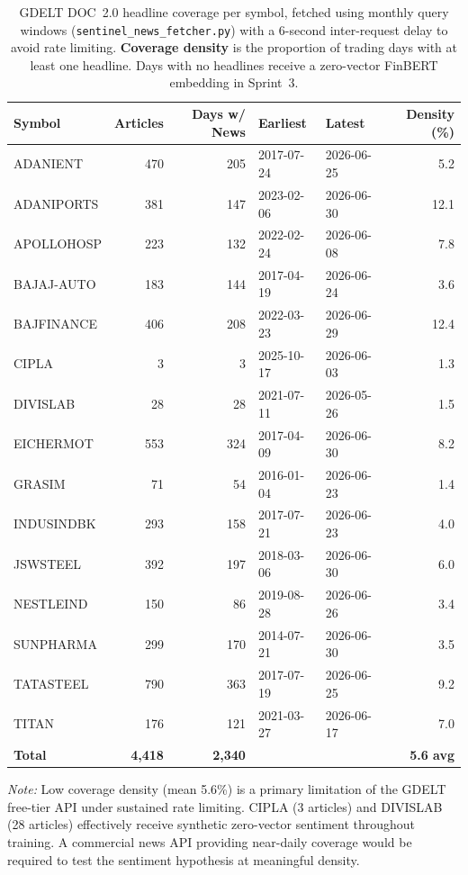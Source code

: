\begin{table}[htbp]
\centering
\caption{%
  GDELT DOC~2.0 headline coverage per symbol, fetched using monthly
  query windows (\texttt{sentinel\_news\_fetcher.py}) with a 6-second
  inter-request delay to avoid rate limiting.
  \textbf{Coverage density} is the proportion of trading days with
  at least one headline. Days with no headlines receive a zero-vector
  FinBERT embedding in Sprint~3.
}
\label{tab:news_coverage}
\setlength{\tabcolsep}{6pt}
\begin{tabular}{l r r l l r}
\toprule
\textbf{Symbol} &
  \textbf{Articles} &
  \textbf{Days w/ News} &
  \textbf{Earliest} &
  \textbf{Latest} &
  \textbf{Density (\%)} \\
\midrule
ADANIENT   & 470 & 205 & 2017-07-24 & 2026-06-25 & 5.2 \\
ADANIPORTS & 381 & 147 & 2023-02-06 & 2026-06-30 & 12.1 \\
APOLLOHOSP & 223 & 132 & 2022-02-24 & 2026-06-08 & 7.8 \\
BAJAJ-AUTO & 183 & 144 & 2017-04-19 & 2026-06-24 & 3.6 \\
BAJFINANCE & 406 & 208 & 2022-03-23 & 2026-06-29 & 12.4 \\
CIPLA      &   3 &   3 & 2025-10-17 & 2026-06-03 & 1.3 \\
DIVISLAB   &  28 &  28 & 2021-07-11 & 2026-05-26 & 1.5 \\
EICHERMOT  & 553 & 324 & 2017-04-09 & 2026-06-30 & 8.2 \\
GRASIM     &  71 &  54 & 2016-01-04 & 2026-06-23 & 1.4 \\
INDUSINDBK & 293 & 158 & 2017-07-21 & 2026-06-23 & 4.0 \\
JSWSTEEL   & 392 & 197 & 2018-03-06 & 2026-06-30 & 6.0 \\
NESTLEIND  & 150 &  86 & 2019-08-28 & 2026-06-26 & 3.4 \\
SUNPHARMA  & 299 & 170 & 2014-07-21 & 2026-06-30 & 3.5 \\
TATASTEEL  & 790 & 363 & 2017-07-19 & 2026-06-25 & 9.2 \\
TITAN      & 176 & 121 & 2021-03-27 & 2026-06-17 & 7.0 \\
\midrule
\textbf{Total} & \textbf{4{,}418} & \textbf{2{,}340} & & & \textbf{5.6 avg} \\
\bottomrule
\end{tabular}

\smallskip
\footnotesize
\textit{Note:} Low coverage density (mean 5.6\%) is a primary limitation
of the GDELT free-tier API under sustained rate limiting. CIPLA (3 articles)
and DIVISLAB (28 articles) effectively receive synthetic zero-vector sentiment
throughout training. A commercial news API providing near-daily coverage
would be required to test the sentiment hypothesis at meaningful density.
\end{table}


